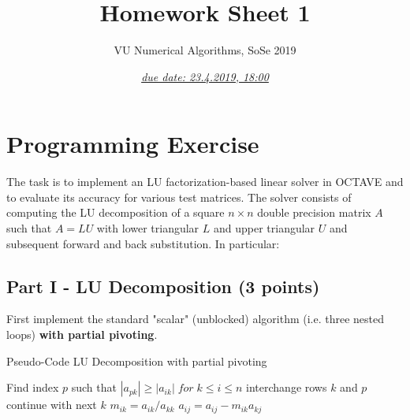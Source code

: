 \documentclass{scrartcl}
\title{Homework Sheet 1}
\subtitle{VU Numerical Algorithms, SoSe 2019}
\date{\underline{\emph{due date: 23.4.2019, 18:00}}}
\newenvironment{mymdframed}[1]{%
\mdfsetup{%
frametitle={\colorbox{white}{\,#1\,}},
frametitleaboveskip=-\ht\strutbox,
frametitlealignment=\raggedright
}%
\begin{mdframed}[style=exampledefault]
}{\end{mdframed}}
\begin{document}
\maketitle



\section*{Programming Exercise}
    The task is to implement an LU factorization-based linear solver in OCTAVE and to evaluate its accuracy for various test matrices. The solver consists of computing the LU decomposition of a square $n \times n$ double precision matrix $A$ such that $A = LU$ with lower triangular $L$ and upper triangular $U$ and subsequent forward and back substitution. In particular:
        
    \subsection*{Part I - LU Decomposition (3 points)}
        First implement the standard "scalar" (unblocked) algorithm (i.e. three nested loops) \textbf{with partial pivoting}.
        
        \begin{algorithm}
            \caption{Pseudo-Code LU Decomposition with partial pivoting}
            \begin{algorithmic}\label{alg:plu}
                    \STATE Find index $p$ such that
                    \STATE $|a_{pk}| \geq |a_{ik}| \; for \; k \leq i \leq n$
                        \STATE interchange rows $k$ and $p$
                    \ENDIF
                        \STATE continue with next $k$
                    \ENDIF
                        \STATE $m_{ik} = a_{ik} / a_{kk}$
                    \ENDFOR
                            \STATE $a_{ij} = a_{ij} - m_{ik}a_{kj}$
                        \ENDFOR
                    \ENDFOR
                \ENDFOR
            \end{algorithmic}
        \end{algorithm}
    
\end{document}

